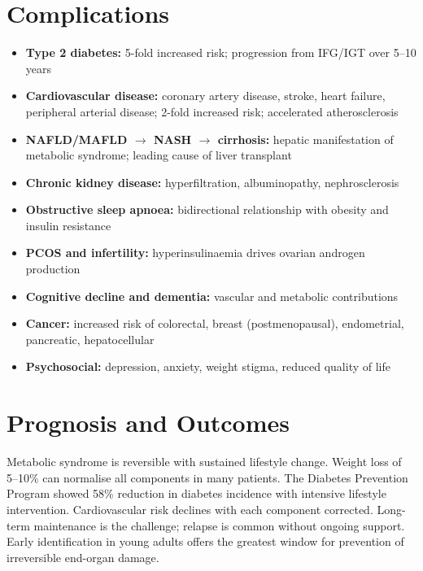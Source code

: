 \section*{Complications}
\begin{itemize}
    \item \textbf{Type 2 diabetes:} 5-fold increased risk; progression from IFG/IGT over 5--10 years
    \item \textbf{Cardiovascular disease:} coronary artery disease, stroke, heart failure, peripheral arterial disease; 2-fold increased risk; accelerated atherosclerosis
    \item \textbf{NAFLD/MAFLD $\to$ NASH $\to$ cirrhosis:} hepatic manifestation of metabolic syndrome; leading cause of liver transplant
    \item \textbf{Chronic kidney disease:} hyperfiltration, albuminopathy, nephrosclerosis
    \item \textbf{Obstructive sleep apnoea:} bidirectional relationship with obesity and insulin resistance
    \item \textbf{PCOS and infertility:} hyperinsulinaemia drives ovarian androgen production
    \item \textbf{Cognitive decline and dementia:} vascular and metabolic contributions
    \item \textbf{Cancer:} increased risk of colorectal, breast (postmenopausal), endometrial, pancreatic, hepatocellular
    \item \textbf{Psychosocial:} depression, anxiety, weight stigma, reduced quality of life
\end{itemize}

\section*{Prognosis and Outcomes}
Metabolic syndrome is reversible with sustained lifestyle change. Weight loss of 5--10\% can normalise all components in many patients. The Diabetes Prevention Program showed 58\% reduction in diabetes incidence with intensive lifestyle intervention. Cardiovascular risk declines with each component corrected. Long-term maintenance is the challenge; relapse is common without ongoing support. Early identification in young adults offers the greatest window for prevention of irreversible end-organ damage.

